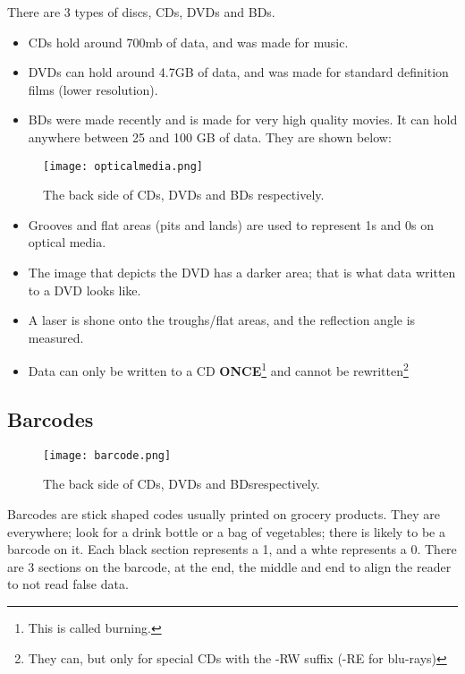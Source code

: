 \documentclass[../main.tex]{subfiles}
\begin{document}
There are 3 types of discs, CDs, DVDs and BDs.
\begin{itemize}
    \item CDs hold around 700mb of data, and was made for music.
    \item DVDs can hold around 4.7GB of data, and was made for standard definition films (lower resolution).
    \item BDs were made recently and is made for very high quality movies. It can hold anywhere between 25 and 100 GB of data. They are shown below:
\end{itemize}

\begin{figure}[H]
    \centering
    \texttt{[image: opticalmedia.png]}
    \caption{The back side of CDs, DVDs and BDs respectively.}
    \label{fig:opticalmedia}
\end{figure}

\begin{itemize}
    \item Grooves and flat areas (pits and lands) are used to represent 1s and 0s on optical media.
    \item The image that depicts the DVD has a darker area; that is what data written to a DVD looks like.
    \item A laser is shone onto the troughs/flat areas, and the reflection angle is measured.
    \item Data can only be written to a CD \textbf{ONCE}\footnote{This is called burning.} and cannot be rewritten\footnote{They can, but only for special CDs with the -RW suffix (-RE for blu-rays)}
\end{itemize}

\subsection{Barcodes}

\begin{figure}[H]
    \centering
    \texttt{[image: barcode.png]}
    \caption{The back side of CDs, DVDs and BDsrespectively.}
    \label{fig:barcode_again}
\end{figure}

Barcodes are stick shaped codes usually printed on grocery products. They are everywhere; look for a drink bottle or a bag of vegetables; there is likely to be a barcode on it. Each black section represents a 1, and a whte represents a 0. There are 3 sections on the barcode, at the end, the middle and end to align the reader to not read false data.
\end{document}
